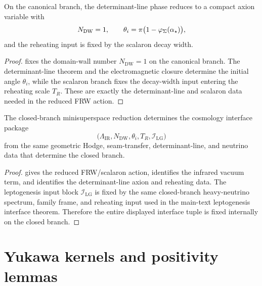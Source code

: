 \begin{lemma}
\label{lem:determinant-line-axion-reduction}
On the canonical branch, the determinant-line phase reduces to a compact axion variable with
\[
N_{\mathrm{DW}}=1,
\qquad
\theta_i=\pi\bigl(1-\varphi_{\Sigma}(\alpha_\star)\bigr),
\]
and the reheating input is fixed by the scalaron decay width.
\end{lemma}

\begin{proof}
 fixes the domain-wall number $N_{\mathrm{DW}}=1$ on the
canonical branch. The determinant-line theorem and the electromagnetic closure determine the initial
angle $\theta_i$, while the scalaron branch fixes the decay-width input entering the reheating scale
$T_R$. These are exactly the determinant-line and scalaron data needed in the reduced FRW action.
\end{proof}

\begin{theorem}
\label{thm:full-frw-interface-theorem}
The closed-branch minisuperspace reduction determines the cosmology interface package
\[
\bigl(\Lambda_{\mathrm{IR}},N_{\mathrm{DW}},\theta_i,T_R,\mathcal I_{\mathrm{LG}}\bigr)
\]
from the same geometric Hodge, seam-transfer, determinant-line, and neutrino data that determine
the closed branch.
\end{theorem}

\begin{proof}
 gives the reduced FRW/scalaron action,
 identifies the infrared vacuum term, and
 identifies the determinant-line axion and reheating
data. The leptogenesis input block $\mathcal I_{\mathrm{LG}}$ is fixed by the same closed-branch
heavy-neutrino spectrum, family frame, and reheating input used in the main-text leptogenesis
interface theorem. Therefore the entire displayed interface tuple is fixed internally on the closed
branch.
\end{proof}

\section{Yukawa kernels and positivity lemmas}
\label{app:yukawa}

